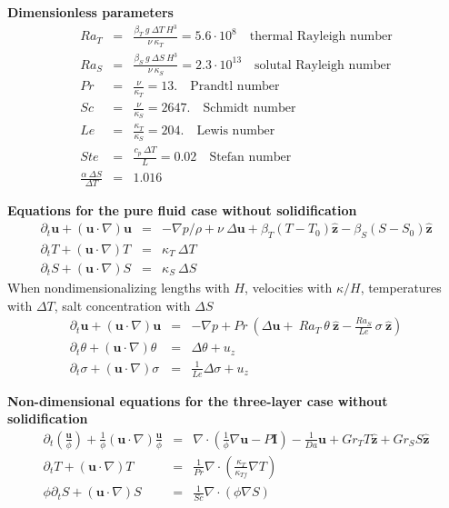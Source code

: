 \documentclass[onecolumn]{revtex4}
\begin{document}
\textbf{Dimensionless parameters}\\ 
\begin{eqnarray}
Ra_{T} &=& \frac{ \beta_T \ g \ \Delta T \ H^3 }{\nu\ \kappa_T} = 5.6 \cdot 10^{8}  \quad \textrm{thermal Rayleigh number}\\
Ra_{S} &=& \frac{ \beta_S \ g \ \Delta S \ H^3 }{\nu\ \kappa_S} = 2.3 \cdot 10^{13}  \quad \textrm{solutal Rayleigh number}\\
Pr &=& \frac{\nu}{\kappa_T} = 13. \quad \textrm{Prandtl number}\\
Sc &=& \frac{\nu}{\kappa_S} = 2647. \quad \textrm{Schmidt number}\\
Le &=& \frac{\kappa_T}{\kappa_S} = 204.  \quad \textrm{Lewis number}\\
Ste &=& \frac{c_p\ \Delta T}{L} = 0.02 \quad \textrm{Stefan number}\\
\frac{\alpha \ \Delta S}{\Delta T} &=&  1.016
\end{eqnarray}

\textbf{Equations for the pure fluid case without solidification}
\begin{eqnarray}
\partial_t {\bm u} + ({\bm u} \cdot \nabla) {\bm u} &=& -\nabla p / \rho + \nu\ \Delta {\bm u} + \beta_T  (T - T_0) \hat{\bm z} - \beta_S (S -S_0) \hat{\bm z}\\
\partial_t T + ({\bm u} \cdot \nabla) T &=&  \kappa_T\ \Delta T\\
\partial_t S + ({\bm u} \cdot \nabla) S &=&  \kappa_S\ \Delta S
\end{eqnarray}
When nondimensionalizing lengths with $H$, velocities with $\kappa/H$, temperatures with $\Delta T$, salt concentration with $\Delta S$ 
\begin{eqnarray}
\partial_t {\bm u} + ({\bm u} \cdot \nabla) {\bm u} &=& -\nabla p + Pr\ \left(  \Delta {\bm u} + \ Ra_T \ \theta\ \hat{\bm z}  -  \frac{Ra_S}{Le} \ \sigma\ \hat{\bm z} \right) \\
\partial_t \theta + ({\bm u} \cdot \nabla) \theta &=&   \Delta \theta + u_z \\
\partial_t \sigma + ({\bm u} \cdot \nabla) \sigma &=&  \frac{1}{Le}  \Delta \sigma + u_z
\end{eqnarray}

\textbf{Non-dimensional equations for the three-layer case without solidification}
\begin{eqnarray}
\partial_t \left(\frac{{\bm u}}{\phi}\right) + \frac{1}{\phi}({\bm u} \cdot \nabla)\frac{ {\bm u} }{\phi}&=& \nabla\cdot\left(\frac{1}{\phi} \nabla {\bm u} - P{\bm I}\right)-\frac{1}{Da}{\bm u} +Gr_T T \hat{\bm z} +Gr_S S \hat{\bm z} \\
\partial_t T + ({\bm u} \cdot \nabla) T &=&  \frac{1}{Pr} \nabla\cdot\left( \frac{\kappa_T}{\kappa_{Tf}}\nabla T\right)\\
\phi \partial_t S + ({\bm u} \cdot \nabla) S &=&  \frac{1}{Sc} \nabla\cdot\left(\phi\nabla S\right)
\end{eqnarray}
\end{document}

